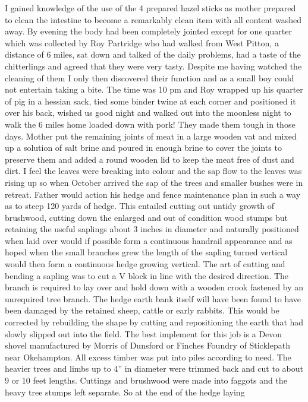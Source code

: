 I gained knowledge of the use of the 4 prepared hazel sticks as mother prepared
to clean the intestine to become a remarkably clean item with all content
washed away. By evening the body had been completely jointed except for one
quarter which was collected by Roy Partridge who had walked from West Pitton, a
distance of 6 miles, sat down and talked of the daily problems, had a taste of
the chitterlings and agreed that they were very tasty. Despite me having
watched the cleaning of them I only then discovered their function and as a
small boy could not entertain taking a bite. The time was 10 pm and Roy
wrapped up his quarter of pig in a hessian sack, tied some binder twine at each
corner and positioned it over his back, wished us good night and walked out
into the moonless night to walk the 6 miles home loaded down with pork! They
made them tough in those days. Mother put the remaining joints of meat in a
large wooden vat and mixed up a solution of salt brine and poured in enough
brine to cover the joints to preserve them and added a round wooden lid to keep
the meat free of dust and dirt. I feel the leaves were breaking into colour and
the sap flow to the leaves was rising up so when October arrived the sap of the
trees and smaller bushes were in retreat. Father would action his hedge and
fence maintenance plan in such a way as to steep 120 yards of hedge. This
entailed cutting out untidy growth of brushwood, cutting down the enlarged and
out of condition wood stumps but retaining the useful saplings about 3 inches
in diameter and naturally positioned when laid over would if possible form a
continuous handrail appearance and as hoped when the small branches grew the
length of the sapling turned vertical would then form a continuous hedge
growing vertical.  The art of cutting and bending a sapling was to cut a V
block in line with the desired direction. The branch is required to lay over
and hold down with a wooden crook fastened by an unrequired tree branch. The
hedge earth bank itself will have been found to have been damaged by the
retained sheep, cattle or early rabbits. This would be corrected by rebuilding
the shape by cutting and repositioning the earth that had slowly slipped out
into the field.  The best implement for this job is a Devon shovel
manufactured by Morris of Dunsford or Finches Foundry of Sticklepath near
Okehampton. All excess timber was put into piles according to need. The
heavier trees and limbs up to 4'' in diameter were trimmed back and cut to
about 9 or 10 feet lengths. Cuttings and brushwood were made into faggots and
the heavy tree stumps left separate. So at the end of the hedge laying

